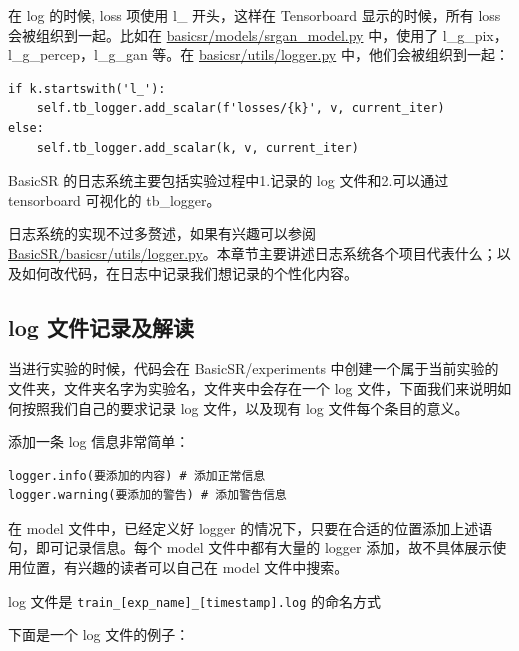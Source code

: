 \documentclass[../main.tex]{subfiles}
\begin{document}
在 log 的时候, loss 项使用 l\_ 开头，这样在 Tensorboard 显示的时候，所有 loss 会被组织到一起。比如在 \href{https://github.com/XPixelGroup/BasicSR/blob/master/basicsr/models/srgan_model.py}{basicsr/models/srgan\_model.py} 中，使用了 l\_g\_pix，l\_g\_percep，l\_g\_gan 等。在 \href{https://github.com/XPixelGroup/BasicSR/blob/master/basicsr/utils/logger.py}{basicsr/utils/logger.py} 中，他们会被组织到一起：
\begin{verbatim}
if k.startswith('l_'):
    self.tb_logger.add_scalar(f'losses/{k}', v, current_iter)
else:
    self.tb_logger.add_scalar(k, v, current_iter)
\end{verbatim}

BasicSR 的日志系统主要包括实验过程中1.记录的 log 文件和2.可以通过 tensorboard 可视化的 tb\_logger。

日志系统的实现不过多赘述，如果有兴趣可以参阅 \href{https://github.com/XPixelGroup/BasicSR/blob/master/basicsr/utils/logger.py}{BasicSR/basicsr/utils/logger.py}。本章节主要讲述日志系统各个项目代表什么；以及如何改代码，在日志中记录我们想记录的个性化内容。

\subsection{log 文件记录及解读}

当进行实验的时候，代码会在 BasicSR/experiments 中创建一个属于当前实验的文件夹，文件夹名字为实验名，文件夹中会存在一个 log 文件，下面我们来说明如何按照我们自己的要求记录 log 文件，以及现有 log 文件每个条目的意义。

\begin{hl} %

    添加一条 log 信息非常简单：

    \begin{verbatim}
logger.info(要添加的内容) # 添加正常信息
logger.warning(要添加的警告) # 添加警告信息
\end{verbatim}
\end{hl}

在 model 文件中，已经定义好 logger 的情况下，只要在合适的位置添加上述语句，即可记录信息。每个 model 文件中都有大量的 logger 添加，故不具体展示使用位置，有兴趣的读者可以自己在 model 文件中搜索。

log 文件是 \texttt{train\_[exp\_name]\_[timestamp].log} 的命名方式

下面是一个 log 文件的例子：
\end{document}
